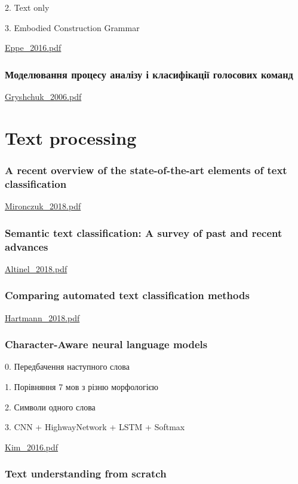 2. Text only

3. Embodied
Construction Grammar

\url{Eppe_2016.pdf}\cite{Eppe_2016}

\subsection{Моделювання процесу аналізу і класифікації голосових команд}

\url{Gryshchuk_2006.pdf}\cite{Gryshchuk_2006}

\chapter{Text processing}

\subsection{A recent overview of the state-of-the-art elements of text classification}

\url{Mironczuk_2018.pdf}\cite{Mironczuk_2018}

\subsection{Semantic text classification: A survey of past and recent advances}

\url{Altinel_2018.pdf}\cite{Altinel_2018} 

\subsection{Comparing automated text classification methods}

\url{Hartmann_2018.pdf}\cite{Hartmann_2018}

\subsection{Character-Aware neural language models}

0. Передбачення наступного слова

1. Порівняння 7 мов з різню морфологією

2. Символи одного слова

3. CNN + HighwayNetwork + LSTM + Softmax

\url{Kim_2016.pdf}\cite{Kim_2016}

\subsection{Text understanding from scratch}

